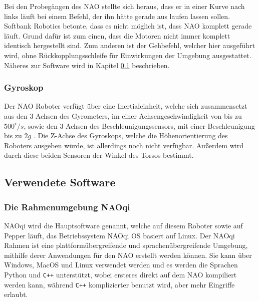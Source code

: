 Bei den Probegängen des NAO stellte sich heraus, dass er in einer Kurve nach links läuft bei einem Befehl, der ihn hätte gerade aus laufen lassen sollen. Softbank Robotics betonte, dass es nicht möglich ist, dass NAO komplett gerade läuft. Grund dafür ist zum einen, dass die Motoren nicht immer komplett identisch hergestellt sind. Zum anderen ist der Gehbefehl, welcher hier ausgeführt wird, ohne Rückkopplungsschleife für Einwirkungen der Umgebung ausgestattet. Näheres zur Software wird in Kapitel \ref{software} beschrieben.



\subsubsection*{Gyroskop}
Der NAO Roboter verfügt über eine Inertialeinheit, welche sich zusammensetzt aus den 3 Achsen des Gyrometers, im einer Achsengeschwindigkeit von bis zu $500^\circ\unit{/s}$, sowie den 3 Achsen des Beschleunigungssensors, mit einer Beschleunigung bis zu $2\unit{g}$ \cite[/Technical overview/Inertial unit]{nao_docu_dev_guide}. Die Z-Achse des Gyroskops, welche die Höhenorientierung des Roboters ausgeben würde, ist allerdings noch nicht verfügbar. Außerdem wird durch diese beiden Sensoren der Winkel des Torsos bestimmt. 
\FloatBarrier

\subsection{Verwendete Software} \label{software}
\subsubsection*{Die Rahmenumgebung NAOqi}
NAOqi wird die Hauptsoftware genannt, welche auf diesem Roboter sowie auf Pepper läuft, das Betriebssystem NAOqi OS basiert auf Linux. Der NAOqi Rahmen ist eine plattformübergreifende und sprachenübergreifende Umgebung, mithilfe derer Anwendungen für den NAO erstellt werden können. Sie kann über Windows, MacOS und Linux verwendet werden und es werden die Sprachen Python und \texttt{C++} unterstützt, wobei ersteres direkt auf dem NAO kompiliert werden kann, während \texttt{C++} komplizierter benutzt wird, aber mehr Eingriffe erlaubt. \cite[/Former NAOqi Framework/Key concepts]{naoqi_dev_guide}

